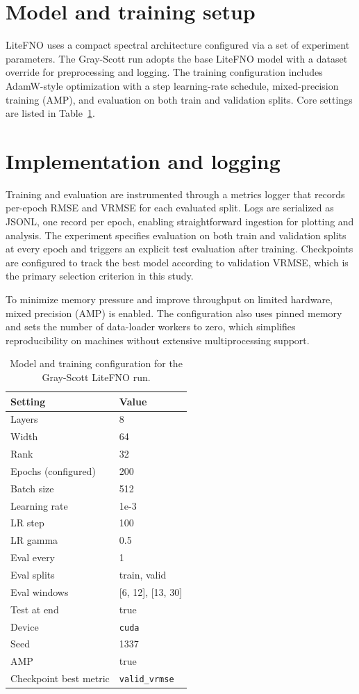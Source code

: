 \documentclass[11pt]{article}
\begin{document}
\section{Model and training setup}
LiteFNO uses a compact spectral architecture configured via a set of experiment
parameters. The Gray-Scott run adopts the base LiteFNO model with a dataset
override for preprocessing and logging. The training configuration includes
AdamW-style optimization with a step learning-rate schedule, mixed-precision
training (AMP), and evaluation on both train and validation splits. Core
settings are listed in Table~\ref{tab:training}.

\section{Implementation and logging}
Training and evaluation are instrumented through a metrics logger that records
per-epoch RMSE and VRMSE for each evaluated split. Logs are serialized as JSONL,
one record per epoch, enabling straightforward ingestion for plotting and
analysis. The experiment specifies evaluation on both train and validation
splits at every epoch and triggers an explicit test evaluation after training.
Checkpoints are configured to track the best model according to validation
VRMSE, which is the primary selection criterion in this study.

To minimize memory pressure and improve throughput on limited hardware, mixed
precision (AMP) is enabled. The configuration also uses pinned memory and sets
the number of data-loader workers to zero, which simplifies reproducibility on
machines without extensive multiprocessing support.

\begin{table}[t]
  \centering
  \caption{Model and training configuration for the Gray-Scott LiteFNO run.}
  \label{tab:training}
  \begin{tabular}{ll}
    \toprule
    Setting & Value \\
    \midrule
    Layers & 8 \\
    Width & 64 \\
    Rank & 32 \\
    Epochs (configured) & 200 \\
    Batch size & 512 \\
    Learning rate & 1e{-}3 \\
    LR step & 100 \\
    LR gamma & 0.5 \\
    Eval every & 1 \\
    Eval splits & train, valid \\
    Eval windows & [6, 12], [13, 30] \\
    Test at end & true \\
    Device & \texttt{cuda} \\
    Seed & 1337 \\
    AMP & true \\
    Checkpoint best metric & \texttt{valid\_vrmse} \\
    \bottomrule
  \end{tabular}
\end{table}
\end{document}

